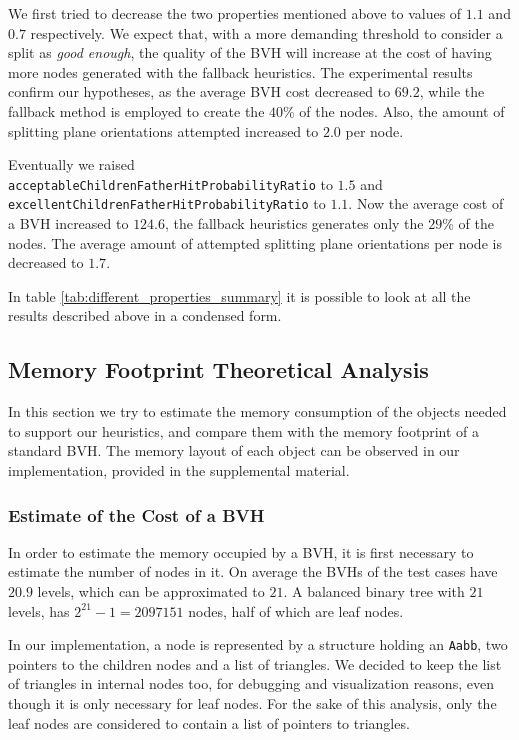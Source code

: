 \documentclass[acmtog, anonymous, review]{acmart}
\begin{document}
We first tried to decrease the two properties mentioned above to values of $1.1$ and $0.7$ respectively. We expect that, with a more demanding threshold to consider a split as \textit{good enough}, the quality of the BVH will increase at the cost of having more nodes generated with the fallback heuristics. The experimental results confirm our hypotheses, as the average BVH cost decreased to $69.2$, while the fallback method is employed to create the $40\%$ of the nodes. Also, the amount of splitting plane orientations attempted increased to $2.0$ per node.

Eventually we raised \\\texttt{acceptableChildrenFatherHitProbabilityRatio} to $1.5$ and \\\texttt{excellentChildrenFatherHitProbabilityRatio} to $1.1$. Now the average cost of a BVH increased to $124.6$, the fallback heuristics generates only the $29\%$ of the nodes. The average amount of attempted splitting plane orientations per node is decreased to $1.7$.

In table \ref{tab:different_properties_summary} it is possible to look at all the results described above in a condensed form.

\subsection{Memory Footprint Theoretical Analysis}
In this section we try to estimate the memory consumption of the objects needed to support our heuristics, and compare them with the memory footprint of a standard BVH. The memory layout of each object can be observed in our implementation, provided in the supplemental material.

\subsubsection{Estimate of the Cost of a BVH}
In order to estimate the memory occupied by a BVH, it is first necessary to estimate the number of nodes in it. On average the BVHs of the test cases have $20.9$ levels, which can be approximated to $21$. A balanced binary tree with $21$ levels, has $2^{21}-1 = 2097151$ nodes, half of which are leaf nodes.

In our implementation, a node is represented by a structure holding an \texttt{Aabb}, two pointers to the children nodes and a list of triangles. We decided to keep the list of triangles in internal nodes too, for debugging and visualization reasons, even though it is only necessary for leaf nodes. For the sake of this analysis, only the leaf nodes are considered to contain a list of pointers to triangles. 
\end{document}
